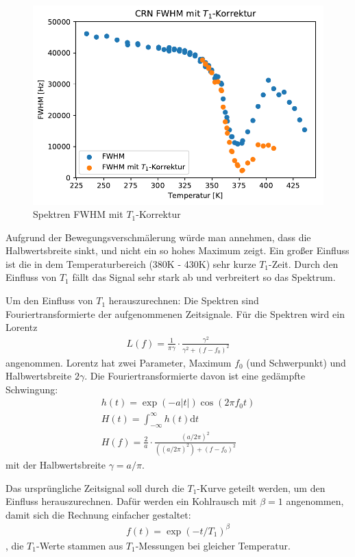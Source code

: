 \begin{figure}
	\begin{center}
		\includegraphics[width=\textwidth]{graphics/plots/SPEK/spek_t1korr.pdf}
	\end{center}
	\caption{Spektren FWHM mit $T_1$-Korrektur} \label{fig:res:spek_fwhm_t1}
\end{figure}
Aufgrund der Bewegungsverschmälerung würde man annehmen, dass die Halbwertsbreite sinkt, und nicht ein so hohes Maximum zeigt. Ein großer Einfluss ist die in dem Temperaturbereich (380K - 430K) sehr kurze $T_1$-Zeit. Durch den Einfluss von $T_1$ fällt das Signal sehr stark ab und verbreitert so das Spektrum.

Um den Einfluss von $T_1$ herauszurechnen: Die Spektren sind Fouriertransformierte der aufgenommenen Zeitsignale. Für die Spektren wird ein Lorentz 
\begin{align}
    L(f) = \frac{1}{\pi \gamma} \cdot \frac{\gamma^2}{\gamma^2 + (f - f_0)^2}
\end{align}
angenommen. Lorentz hat zwei Parameter, Maximum $f_0$ (und Schwerpunkt) und Halbwertsbreite $2\gamma$. Die Fouriertransformierte davon ist eine gedämpfte Schwingung:
\begin{align}
    h(t) = \exp{(-a |t|)} \cos{(2 \pi f_0 t)} \\
    H(t) = \int_{-\infty}^{\infty} h(t) \text{d} t \\
    H(f) = \frac{2}{a} \cdot \frac{(a/2\pi)^2}{((a/2\pi)^2) + (f - f_0)^2}
\end{align}
mit der Halbwertsbreite $\gamma = a/\pi$.

Das ursprüngliche Zeitsignal soll durch die $T_1$-Kurve geteilt werden, um den Einfluss herauszurechnen. Dafür werden ein Kohlrausch mit $\beta = 1$ angenommen, damit sich die Rechnung einfacher gestaltet:
\begin{align}
    f(t) = \exp{(-t/T_1)^\beta}
\end{align}
, die $T_1$-Werte stammen aus $T_1$-Messungen bei gleicher Temperatur. 

